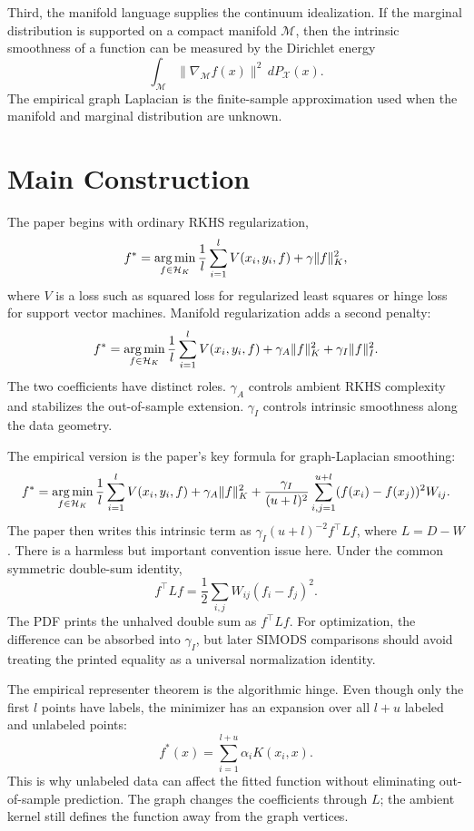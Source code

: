 \documentclass[11pt]{article}
\begin{document}
Third, the manifold language supplies the continuum idealization.  If the
marginal distribution is supported on a compact manifold $\mathcal{M}$, then
the intrinsic smoothness of a function can be measured by the Dirichlet energy
\[
  \int_{\mathcal{M}} \|\nabla_{\mathcal{M}} f(x)\|^2\,dP_{\mathcal{X}}(x).
\]
The empirical graph Laplacian is the finite-sample approximation used when
the manifold and marginal distribution are unknown.

\section{Main Construction}

The paper begins with ordinary RKHS regularization,
\[
  f^\ast
  =
  \operatorname*{arg\,min}_{f\in\mathcal{H}_K}
  \frac{1}{l}\sum_{i=1}^{l} V(x_i,y_i,f)
  +
  \gamma \|f\|_K^2,
\]
where $V$ is a loss such as squared loss for regularized least squares or
hinge loss for support vector machines.  Manifold regularization adds a second
penalty:
\[
  f^\ast
  =
  \operatorname*{arg\,min}_{f\in\mathcal{H}_K}
  \frac{1}{l}\sum_{i=1}^{l} V(x_i,y_i,f)
  +
  \gamma_A \|f\|_K^2
  +
  \gamma_I \|f\|_I^2 .
\]
The two coefficients have distinct roles.  $\gamma_A$ controls ambient RKHS
complexity and stabilizes the out-of-sample extension.  $\gamma_I$ controls
intrinsic smoothness along the data geometry.

The empirical version is the paper's key formula for graph-Laplacian
smoothing:
\[
\begin{split}
  f^\ast
  =
  \operatorname*{arg\,min}_{f\in\mathcal{H}_K}
  \frac{1}{l}\sum_{i=1}^{l} V(x_i,y_i,f)
  +
  \gamma_A \|f\|_K^2
  +
  \frac{\gamma_I}{(u+l)^2}
  \sum_{i,j=1}^{u+l}
  (f(x_i)-f(x_j))^2 W_{ij}.
\end{split}
\]
The paper then writes this intrinsic term as
$\gamma_I (u+l)^{-2} f^\top L f$, where $L=D-W$.  There is a harmless but
important convention issue here.  Under the common symmetric double-sum
identity,
\[
  f^\top L f
  =
  \frac{1}{2}\sum_{i,j} W_{ij}(f_i-f_j)^2 .
\]
The PDF prints the unhalved double sum as $f^\top L f$.  For optimization,
the difference can be absorbed into $\gamma_I$, but later SIMODS comparisons
should avoid treating the printed equality as a universal normalization
identity.

The empirical representer theorem is the algorithmic hinge.  Even though only
the first $l$ points have labels, the minimizer has an expansion over all
$l+u$ labeled and unlabeled points:
\[
  f^\ast(x)=\sum_{i=1}^{l+u}\alpha_i K(x_i,x).
\]
This is why unlabeled data can affect the fitted function without eliminating
out-of-sample prediction.  The graph changes the coefficients through $L$;
the ambient kernel still defines the function away from the graph vertices.
\end{document}
